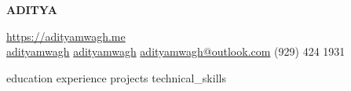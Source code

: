 \documentclass[a4paper, 11pt]{article}
\begin{document}
\begin{center}
	\vspace*{-10pt}
	\begin{center}
		\uppercase{\Huge \bfseries Aditya }
	\end{center}
	\vspace{4pt}
	\href{https://adityamwagh.me}{https://adityamwagh.me} \\

	\vspace{4pt}
	\faLinkedin\space{} \href{https://linkedin.com/in/adityamwagh}{adityamwagh} \space{}
	\faGithub{} \space{} \href{https://github.com/adityamwagh}{adityamwagh} \space{}
	\faAt{} \space{} \href{mailto:adityamwagh@outlook.com}{adityamwagh@outlook.com} \space{}
	\faPhone{} \space{} (929) 424 1931 \\

	\vspace{8pt}
\end{center}

\justifying{}
{education}
{experience}
{projects}
{technical_skills}

\end{document}
